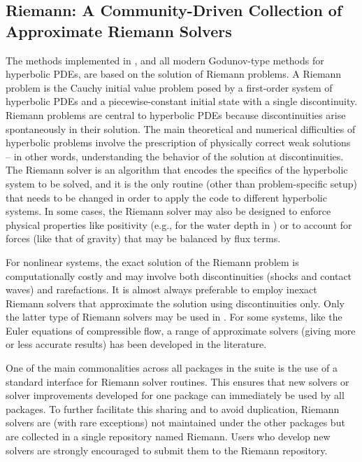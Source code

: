 %
%
%

\subsection{Riemann: A Community-Driven Collection of Approximate Riemann Solvers}
The methods implemented in \clawpack, and all modern Godunov-type methods for
hyperbolic PDEs, are based on the solution of Riemann problems.  A Riemann
problem is the Cauchy initial value problem posed by a first-order system of
hyperbolic PDEs and a piecewise-constant initial state with a single
discontinuity.  Riemann problems are central to hyperbolic PDEs because
discontinuities arise spontaneously in their solution.  The main theoretical
and numerical difficulties of hyperbolic problems involve the prescription of
physically correct weak solutions -- in other words, understanding the behavior
of the solution at discontinuities.  The Riemann solver is an algorithm that
encodes the specifics of the hyperbolic system to be solved, and it is the only
routine (other than problem-specific setup) that needs to be changed in order
to apply the code to different hyperbolic systems.  In some cases, the Riemann
solver may also be designed to enforce physical properties like positivity
(e.g., for the water depth in \geoclaw) or to account for forces (like that
of gravity) that may be balanced by flux terms.

For nonlinear systems, the exact solution of the Riemann problem is computationally
costly and may involve both discontinuities (shocks and contact waves) and
rarefactions.  It is almost always preferable to employ inexact Riemann solvers
that approximate the solution using discontinuities only.  Only the latter type
of Riemann solvers may be used in \clawpack.  For some systems, like the Euler
equations of compressible flow, a range of approximate solvers (giving 
more or less accurate results) has been developed in the literature.

One of the main commonalities across all packages in the \clawpack suite is the
use of a standard interface for Riemann solver routines.  This ensures that new
solvers or solver improvements developed for one package can immediately
be used by all packages.  To further facilitate this sharing and to avoid 
duplication, Riemann solvers are (with rare exceptions) not maintained under
the other packages but are collected in a single repository named Riemann.
Users who develop new solvers are strongly encouraged to submit them to the
Riemann repository.

